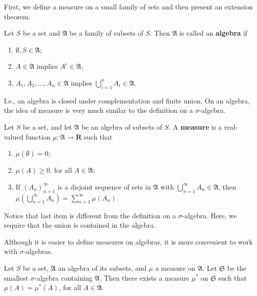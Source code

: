 First, we define a measure on a small family of sets and then present an extension theorem.

\begin{definition}
	Let $S$ be a set and $\mathfrak{A}$ be a family of subsets of $S$. Then $\mathfrak{A}$ is called an \textbf{algebra} if 
	\begin{enumerate}
		\item $\emptyset, S \in \mathfrak{A}$;
		\item $A \in \mathfrak{A}$ implies $A^c \in \mathfrak{A}$;
		\item $A_1, A_2, \ldots, A_n \in \mathfrak{A}$ implies $\bigcup_{i=1}^n A_i \in \mathfrak{A}$.
	\end{enumerate}
\end{definition}

I.e., an algebra is closed under complementation and finite union. On an algebra, the idea of measure is very much similar to the definition on a $\sigma$-algebra.

\begin{definition}
	Let $S$ be a set, and let $\mathfrak{A}$ be an algebra of subsets of $S$. A \textbf{measure} is a real-valued function $\mu : \mathfrak{A} \longrightarrow \overline{\textbf{R}}$ such that 
	\begin{enumerate}
		\item $\mu ( \emptyset ) = 0$;
		\item $\mu(A) \geq 0$, for all $A \in \mathfrak{A}$;
		\item If $(A_n)_{n=1}^\infty$ is a disjoint sequence of sets in $\mathfrak{A}$ with $\bigcup_{n=1}^\infty A_n \in \mathfrak{A}$, then $\mu \left( \bigcup_{n=1}^\infty A_n \right) = \sum_{n=1}^\infty \mu(A_n)$.
	\end{enumerate}
\end{definition}

Notice that last item is different from the definition on a $\sigma$-algebra. Here, we require that the union is contained in the algebra.

Although it is easier to define measures on algebras, it is more convenient to work with $\sigma$-algebras.

\begin{theorem}\label{thm:caratheodory}
	Let $S$ be a set, $\mathfrak{A}$ an algebra of its subsets, and $\mu$ a measure on $\mathfrak{A}$. Let $\mathfrak{S}$ be the smallest $\sigma$-algebra containing $\mathfrak{A}$. Then there exists a measure $\mu^{\ast}$ on $\mathfrak{S}$ such that $\mu(A) = \mu^{\ast}(A)$, for all $A \in \mathfrak{A}$.
\end{theorem}

